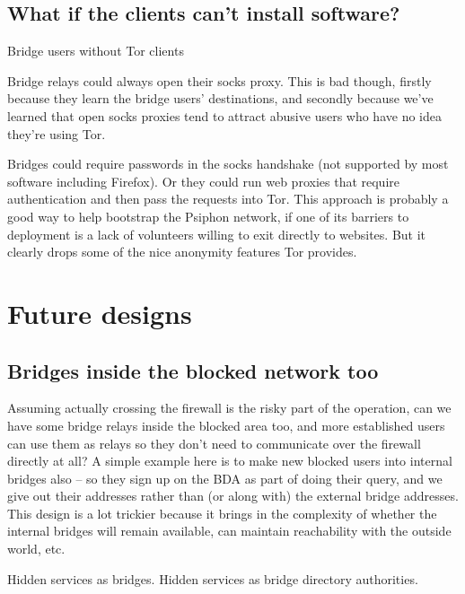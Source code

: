 \documentclass{llncs}
\begin{document}
\subsection{What if the clients can't install software?}

Bridge users without Tor clients

Bridge relays could always open their socks proxy. This is bad though,
firstly
because they learn the bridge users' destinations, and secondly because
we've learned that open socks proxies tend to attract abusive users who
have no idea they're using Tor.

Bridges could require passwords in the socks handshake (not supported
by most software including Firefox). Or they could run web proxies
that require authentication and then pass the requests into Tor. This
approach is probably a good way to help bootstrap the Psiphon network,
if one of its barriers to deployment is a lack of volunteers willing
to exit directly to websites. But it clearly drops some of the nice
anonymity features Tor provides.

\section{Future designs}

\subsection{Bridges inside the blocked network too}

Assuming actually crossing the firewall is the risky part of the
operation, can we have some bridge relays inside the blocked area too,
and more established users can use them as relays so they don't need to
communicate over the firewall directly at all? A simple example here is
to make new blocked users into internal bridges also -- so they sign up
on the BDA as part of doing their query, and we give out their addresses
rather than (or along with) the external bridge addresses. This design
is a lot trickier because it brings in the complexity of whether the
internal bridges will remain available, can maintain reachability with
the outside world, etc.

Hidden services as bridges. Hidden services as bridge directory authorities.

 
\end{document}

